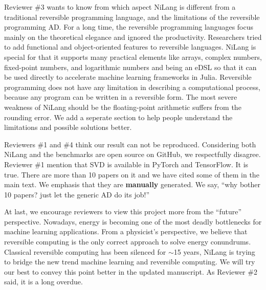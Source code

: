 \documentclass{article}
\begin{document}
Reviewer \#3 wants to know from which aspect NiLang is different from a traditional reversible programming language, and the limitations of the reversible programming AD.
For a long time, the reversible programming languages focus mainly on the theoretical elegance and ignored the productivity. Researchers tried to add functional and object-oriented features to reversible languages.
NiLang is special for that it supports many practical elements like arrays, complex numbers, fixed-point numbers, and logarithmic numbers and being an eDSL so that it can be used directly to accelerate machine learning frameworks in Julia.
Reversible programming does not have any limitation in describing a computational process, because any program can be written in a reversible form. The most severe weakness of NiLang should be the floating-point arithmetic suffers from the rounding error.
We add a seperate section to help people understand the limitations and possible solutions better.

Reviewers \#1 and \#4 think our result can not be reproduced. Considering both NiLang and the benchmarks are open source on GitHub, we respectfully disagree.
Reviewer \#1 mention that SVD is available in PyTorch and TensorFlow. It is true. There are more than 10 papers on it and we have cited some of them in the main text. We emphasis that they are \textbf{manually} generated. We say, ``why bother 10 papers? just let the generic AD do its job!''

At last, we encourage reviewers to view this project more from the ``future'' perspective.
Nowadays, energy is becoming one of the most deadly bottlenecks for machine learning applications.
From a physicist's perspective, we believe that reversible computing is the only correct approach to solve energy conundrums.
Classical reversible computing has been silenced for $\sim$15 years, NiLang is trying to bridge the new trend machine learning and reversible computing.
We will try our best to convey this point better in the updated manuscript. As Reviewer \#2 said, it is a long overdue.
\end{document}
